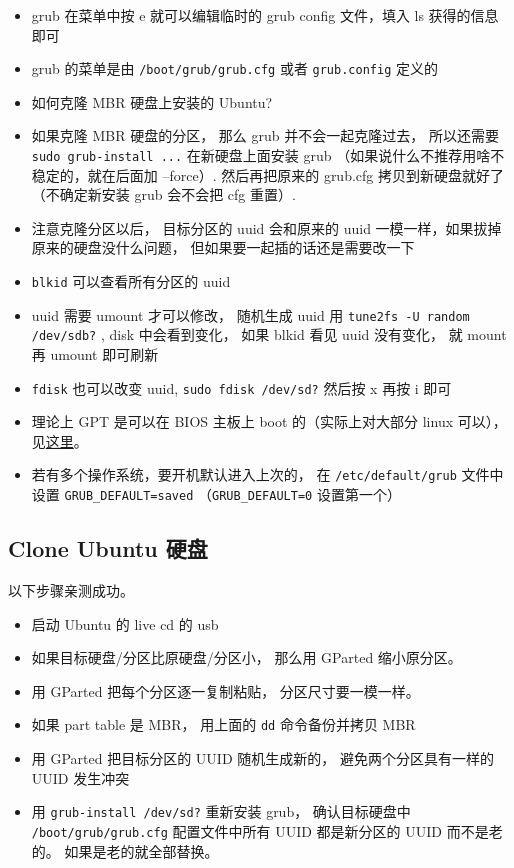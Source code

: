 \begin{itemize}
\item grub 在菜单中按 e 就可以编辑临时的 grub config 文件，填入 ls 获得的信息即可
\item grub 的菜单是由 \verb`/boot/grub/grub.cfg` 或者 \verb`grub.config` 定义的
\item 如何克隆 MBR 硬盘上安装的 Ubuntu?
\item 如果克隆 MBR 硬盘的分区， 那么 grub 并不会一起克隆过去， 所以还需要 \verb`sudo grub-install ...` 在新硬盘上面安装 grub （如果说什么不推荐用啥不稳定的，就在后面加 --force）. 然后再把原来的 grub.cfg 拷贝到新硬盘就好了（不确定新安装 grub 会不会把 cfg 重置）.
\item 注意克隆分区以后， 目标分区的 uuid 会和原来的 uuid 一模一样，如果拔掉原来的硬盘没什么问题， 但如果要一起插的话还是需要改一下
\item \verb`blkid` 可以查看所有分区的 uuid
\item uuid 需要 umount 才可以修改， 随机生成 uuid 用 \verb`tune2fs -U random /dev/sdb?` , disk 中会看到变化， 如果 blkid 看见 uuid 没有变化， 就 mount 再 umount 即可刷新
\item \verb`fdisk` 也可以改变 uuid, \verb`sudo fdisk /dev/sd?` 然后按 x 再按 i 即可
\item 理论上 GPT 是可以在 BIOS 主板上 boot 的（实际上对大部分 linux 可以）， 见\href{https://superuser.com/questions/1337344/is-it-possible-to-boot-linux-from-a-gpt-disk-on-a-bios-system}{这里}。
\item 若有多个操作系统，要开机默认进入上次的， 在 \verb`/etc/default/grub` 文件中设置 \verb`GRUB_DEFAULT=saved` （\verb`GRUB_DEFAULT=0` 设置第一个）
\end{itemize}

\subsection{Clone Ubuntu 硬盘}
以下步骤亲测成功。
\begin{itemize}
\item 启动 Ubuntu 的 live cd 的 usb
\item 如果目标硬盘/分区比原硬盘/分区小， 那么用 GParted 缩小原分区。
\item 用 GParted 把每个分区逐一复制粘贴， 分区尺寸要一模一样。
\item 如果 part table 是 MBR， 用上面的 \verb`dd` 命令备份并拷贝 MBR
\item 用 GParted 把目标分区的 UUID 随机生成新的， 避免两个分区具有一样的 UUID 发生冲突
\item 用 \verb`grub-install /dev/sd?` 重新安装 grub， 确认目标硬盘中 \verb`/boot/grub/grub.cfg` 配置文件中所有 UUID 都是新分区的 UUID 而不是老的。 如果是老的就全部替换。
\end{itemize}

